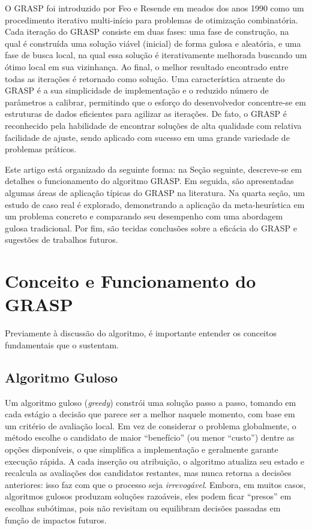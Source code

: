 \documentclass[a4paper, 12pt]{article}
\begin{document}
O GRASP foi introduzido por Feo e Resende em meados dos anos 1990 como um procedimento iterativo multi-início para problemas de otimização combinatória. Cada iteração do GRASP consiste em duas fases: uma fase de construção, na qual é construída uma solução viável (inicial) de forma gulosa e aleatória, e uma fase de busca local, na qual essa solução é iterativamente melhorada buscando um ótimo local em sua vizinhança. Ao final, o melhor resultado encontrado entre todas as iterações é retornado como solução. Uma característica atraente do GRASP é a sua simplicidade de implementação e o reduzido número de parâmetros a calibrar, permitindo que o esforço do desenvolvedor concentre-se em estruturas de dados eficientes para agilizar as iterações. De fato, o GRASP é reconhecido pela habilidade de encontrar soluções de alta qualidade com relativa facilidade de ajuste, sendo aplicado com sucesso em uma grande variedade de problemas práticos.

Este artigo está organizado da seguinte forma: na Seção seguinte, descreve-se em detalhes o funcionamento do algoritmo GRASP. Em seguida, são apresentadas algumas áreas de aplicação típicas do GRASP na literatura. Na quarta seção, um estudo de caso real é explorado, demonstrando a aplicação da meta-heurística em um problema concreto e comparando seu desempenho com uma abordagem gulosa tradicional. Por fim, são tecidas conclusões sobre a eficácia do GRASP e sugestões de trabalhos futuros.

\section{Conceito e Funcionamento do GRASP}
Previamente à discussão do algoritmo, é importante entender os conceitos fundamentais que o sustentam.

\subsection{Algoritmo Guloso}

Um algoritmo guloso (\emph{greedy}) constrói uma solução passo a passo, tomando em cada estágio a decisão que parece ser a melhor naquele momento, com base em um critério de avaliação local. Em vez de considerar o problema globalmente, o método escolhe o candidato de maior “benefício” (ou menor “custo”) dentre as opções disponíveis, o que simplifica a implementação e geralmente garante execução rápida. A cada inserção ou atribuição, o algoritmo atualiza seu estado e recalcula as avaliações dos candidatos restantes, mas nunca retorna a decisões anteriores: isso faz com que o processo seja \emph{irrevogável}. Embora, em muitos casos, algoritmos gulosos produzam soluções razoáveis, eles podem ficar “presos” em escolhas subótimas, pois não revisitam ou equilibram decisões passadas em função de impactos futuros.
\end{document}

